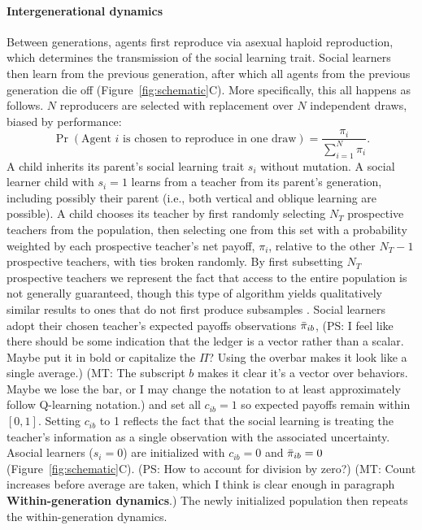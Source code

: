 \documentclass[letterpaper,11.5pt]{scrartcl}
\newcommand{\mt}[1]{{\textcolor{myorange} {({\tiny MT:} #1)}}}
\newcommand{\ps}[1]{{\textcolor{mygreen} {({\tiny PS:} #1)}}}
\begin{document}
\paragraph{Intergenerational dynamics}
Between generations, agents first reproduce via asexual haploid reproduction, which determines the transmission of the social learning trait. Social learners then learn from the
previous generation, after which all agents from the
previous generation die off (Figure~\ref{fig:schematic}C). More specifically, this all happens as follows. 
$N$ reproducers are selected with replacement over $N$ independent draws, 
biased by performance:
\begin{equation}
  \Pr(\text{Agent $i$ is chosen to reproduce in one draw}) = \frac{\pi_i}{\sum_{i=1}^N \pi_i}.
\end{equation}
\noindent
A child inherits its parent's social learning trait $s_i$ without mutation.
A social learner child with $s_i = 1$ learns from a teacher from its parent's
generation, including possibly their parent (i.e., both vertical and oblique learning are possible). 
A child chooses its teacher by first randomly selecting $N_T$ prospective
teachers from the population, then selecting one from this set with a probability weighted by each prospective teacher's net payoff, $\pi_i$,  
relative to the other $N_T - 1$ prospective teachers, with ties broken randomly. By first subsetting $N_T$ prospective teachers we represent the fact that access to the entire population is not generally guaranteed, though this type of algorithm yields qualitatively similar results to ones that do not first produce subsamples \cite{smaldino2019open}. 
Social learners adopt their chosen teacher's expected payoffs observations $\bar\pi_{ib}$, \ps{I feel
like there should be some indication that the ledger is a vector rather than a scalar. Maybe put
it in bold or capitalize the $\Pi$? Using the overbar makes it look like a single average.}
\mt{The subscript $b$ makes it clear it's a vector over behaviors. Maybe we lose the bar,
or I may change the notation to at least approximately follow Q-learning notation.}
and set all $c_{ib} = 1$ so expected payoffs remain within $[0, 1]$. Setting $c_{ib}$ to 1 reflects the fact that the social learning is treating the teacher's information as a single observation with the associated uncertainty.   Asocial
learners ($s_i = 0$) are initialized with $c_{ib} = 0$ and $\bar\pi_{ib} = 0$ 
(Figure~\ref{fig:schematic}C). \ps{How to account for division by zero?} \mt{Count increases
before average are taken, which I think is clear enough in paragraph \textbf{Within-generation
dynamics}.} The
newly initialized population then repeats the within-generation dynamics. 
\end{document}
